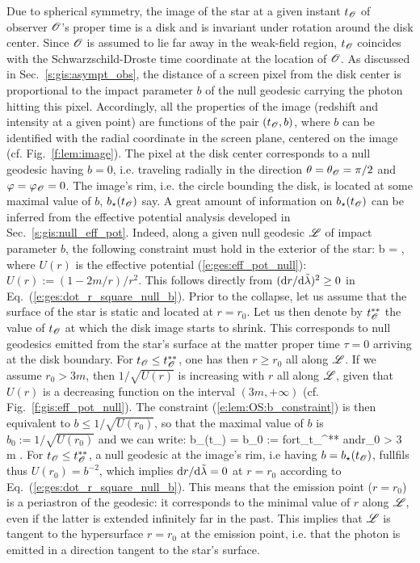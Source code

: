 Due to spherical symmetry, the image of the star at a given instant $t_{\mathscr{O}}$ of
observer $\mathscr{O}$'s proper time is a disk and is invariant
under rotation around the disk center.
Since $\mathscr{O}$ is assumed to lie far away in the weak-field region, $t_{\mathscr{O}}$ coincides
with the Schwarzschild-Droste time coordinate at the location of $\mathscr{O}$.
As discussed in Sec.~\ref{s:gis:asympt_obs},
the distance of a screen pixel from the disk center
is proportional to the impact parameter $b$ of the null geodesic carrying the photon
hitting this pixel.
Accordingly, all the properties of the image (redshift and intensity
at a given point)
are functions of the pair $(t_{\mathscr{O}}, b)$, where $b$ can be identified with the radial coordinate
in the screen plane, centered on the image (cf. Fig.~\ref{f:lem:image}).
The pixel at the disk center corresponds to a null geodesic having $b=0$, i.e.
traveling radially in the direction $\theta=\theta_{\mathscr{O}}=\pi/2$ and $\varphi=\varphi_{\mathscr{O}}=0$.
The image's rim, i.e. the circle bounding the disk, is located at some
maximal value of $b$, $b_\star(t_{\mathscr{O}})$ say.
A great amount of information on $b_\star(t_{\mathscr{O}})$ can be inferred from the effective
potential analysis developed in Sec.~\ref{s:gis:null_eff_pot}. Indeed, along
a given null geodesic $\mathscr{L}$ of impact parameter $b$,
the following constraint must hold in the exterior of the star:
\be \label{e:lem:OS:b_constraint}
    b \leq {} =  ,
\ee
where $U(r)$ is the effective potential (\ref{e:ges:eff_pot_null}):
$U(r) := (1 - 2m/r)/r^2$. This follows directly from
$({\mathrm{d} r}/{\mathrm{d}\tilde{\lambda}})^2\geq 0$ in Eq.~(\ref{e:ges:dot_r_square_null_b}).
Prior to the collapse, let us assume
that the surface of the star is static and located at $r = r_0$.
Let us then denote by $t_{\mathscr{O}}^{**}$ the value of $t_{\mathscr{O}}$ at which the disk image
starts to shrink. This corresponds to
null geodesics emitted from the star's surface
at the matter proper time $\tau=0$  arriving at the disk boundary.
For $t_{\mathscr{O}} \leq t_{\mathscr{O}}^{**}$, one has then $r\geq r_0$ all along $\mathscr{L}$.
If we assume $r_0 > 3m$, then $1/\sqrt{U(r)}$ is increasing with $r$ all along $\mathscr{L}$,
given that $U(r)$ is a decreasing function on the interval $(3m,+\infty)$ (cf. Fig.~\ref{f:gis:eff_pot_null}).
The constraint (\ref{e:lem:OS:b_constraint}) is then equivalent to $b \leq 1/\sqrt{U(r_0)}$, so
that the maximal value of $b$ is $b_0 := 1/\sqrt{U(r_0)}$ and we can write:
\be \label{e:lem:OS:bmax_static}
    b_\star(t_\Obs) = b_0 :=  \quad\mbox{for}\quad  t_\Obs \leq t_\Obs^{**}
        \quad\mbox{and}\quad r_0 > 3 m .
\ee
For $t_{\mathscr{O}} \leq t_{\mathscr{O}}^{**}$, a
null geodesic at the image's rim, i.e having $b=b_\star(t_{\mathscr{O}})$, fullfils
thus $U(r_0) = b^{-2}$, which implies ${\mathrm{d} r}/{\mathrm{d}\tilde{\lambda}} = 0$ at $r=r_0$
according to Eq.~(\ref{e:ges:dot_r_square_null_b}). This means that the emission point
($r=r_0$) is a periastron of the geodesic: it corresponds to the minimal value of $r$ along
$\mathscr{L}$, even if the latter is extended infinitely far in the past. This implies
that $\mathscr{L}$ is tangent to the hypersurface $r=r_0$ at the emission point, i.e. that
the photon is emitted in a direction tangent to the star's surface.

